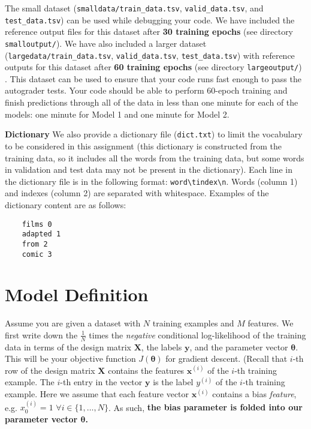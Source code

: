 \documentclass[11pt,addpoints,answers]{exam}
\newcommand{\xv}{\mathbf{x}}
\newcommand{\yv}{\mathbf{y}}
\newcommand{\Xv}{\mathbf{X}}
\newcommand{\thetav     }{\boldsymbol \theta     }
\begin{document}
The small dataset (\lstinline{smalldata/train_data.tsv}, \lstinline{valid_data.tsv}, and \lstinline{test_data.tsv}) can be used while debugging your code. We have included the reference output files for this dataset after \textbf{30 training epochs} (see directory \lstinline{smalloutput/}). 
%
We have also included a larger dataset \\(\lstinline{largedata/train_data.tsv}, \lstinline{valid_data.tsv}, \lstinline{test_data.tsv}) with reference outputs for this dataset after \textbf{60 training epochs}  (see directory \lstinline{largeoutput/}) . This dataset can be used to ensure that your code runs fast enough to pass the autograder tests. Your code should be able to perform 60-epoch training and finish  predictions through all of the data in less than one minute for each of the models: one minute for Model 1 and one minute for Model 2.

  {\bf Dictionary } We also provide a dictionary file (\lstinline{dict.txt}) to limit the vocabulary to be considered in this assignment (this dictionary is constructed from the training data, so it includes all the words from the training data, but some words in validation and test data may not be present in the dictionary). Each line in the dictionary file is in the following format: \lstinline{word\tindex\n}. Words (column 1) and indexes (column 2) are separated with whitespace. Examples of the dictionary content are as follows: 
    \begin{lstlisting}
    films 0
    adapted 1
    from 2
    comic 3
    \end{lstlisting}
 
\section{Model Definition}\label{modeldescript}
 
 Assume you are given a dataset with $N$ training examples and $M$ features. We first write down the $\frac{1}{N}$ times the \emph{negative} conditional log-likelihood of the training data in terms of the design matrix $\Xv$, the labels $\yv$, and the parameter vector $\thetav$. This will be your objective function $J(\thetav)$ for gradient descent. 
%
(Recall that $i$-th row of the design matrix $\Xv$ contains the features $\xv^{(i)}$ of the $i$-th training example. The $i$-th entry in the vector $\yv$ is the label $y^{(i)}$ of the $i$-th training example.  Here we assume that each feature vector $\xv^{(i)}$ contains a bias \emph{feature}, e.g. $x_0^{(i)} = 1 \,\,\forall i \in \{1,\ldots,N\}$. As such, \textbf{the bias parameter is folded into our parameter vector $\thetav$.}
\end{document}
